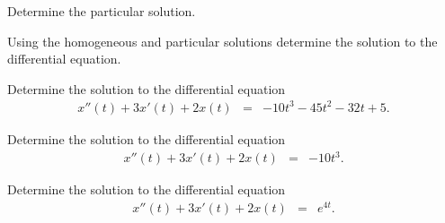 \begin{problem}
\begin{subproblem}
          \clearpage

        \item Determine the particular solution.
          \vfill

        \item Using the homogeneous and particular solutions determine
          the solution to the differential equation.

          \vfill

      \end{subproblem}

      \clearpage

    \item Determine the solution to the differential equation
      \begin{eqnarray*}
        x''(t) + 3x'(t) + 2x(t) & = & -10 t^3 - 45 t^2 - 32 t + 5.
      \end{eqnarray*}

      \vfill
      \clearpage


    \item Determine the solution to the differential equation
      \begin{eqnarray*}
        x''(t) + 3x'(t) + 2x(t) & = & -10 t^3.
      \end{eqnarray*}

      \vfill
      \clearpage

    \item Determine the solution to the differential equation
      \begin{eqnarray*}
        x''(t) + 3x'(t) + 2x(t) & = & e^{4t}.
      \end{eqnarray*}

      \vfill


      \clearpage


\end{problem}

